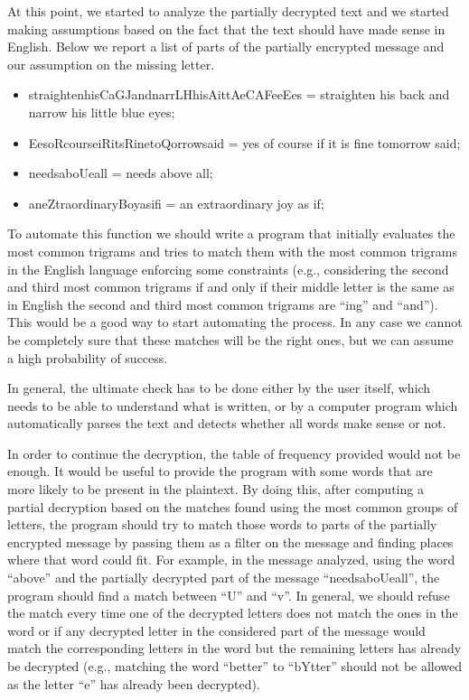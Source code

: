 \documentclass[12pt]{article}
\begin{document}
At this point, we started to analyze the partially decrypted text and we started making assumptions based on the fact that the text should have made sense in English. Below we report a list of parts of the partially encrypted message and our assumption on the missing letter.

\begin{itemize}
    \item straightenhisCaGJandnarrLHhisAittAeCAFeeEes = straighten his back and narrow his little blue eyes;
    \item EesoRcourseiRitsRinetoQorrowsaid = yes of course if it is fine tomorrow said;
    \item needsaboUeall = needs above all;
    \item aneZtraordinaryBoyasifi = an extraordinary joy as if;
\end{itemize} 

To automate this function we should write a program that initially evaluates the most common trigrams and tries to match them with the most common trigrams in the English language enforcing some constraints (e.g., considering the second and third most common trigrams if and only if their middle letter is the same as in English the second and third most common trigrams are ``ing'' and ``and''). This would be a good way to start automating the process. In any case we cannot be completely sure that these matches will be the right ones, but we can assume a high probability of success. 

In general, the ultimate check has to be done either by the user itself, which needs to be able to understand what is written, or by a computer program which automatically parses the text and detects whether all words make sense or not.

In order to continue the decryption, the table of frequency provided would not be enough. 
It would be useful to provide the program with some words that are more likely to be present in the plaintext. 
By doing this, after computing a partial decryption based on the matches found using the most common groups of letters, the program should try to match those words to parts of the partially encrypted message by passing them as a filter on the message and finding places where that word could fit. 
For example, in the message analyzed, using the word ``above'' and the partially decrypted part of the message ``needsaboUeall'', the program should find a match between ``U'' and ``v''. 
In general, we should refuse the match every time one of the decrypted letters does not match the ones in the word or if any decrypted letter in the considered part of the message would match the corresponding letters in the word but the remaining letters has already be decrypted (e.g., matching the word ``better'' to ``bYtter'' should not be allowed as the letter ``e'' has already been decrypted).
\end{document}
